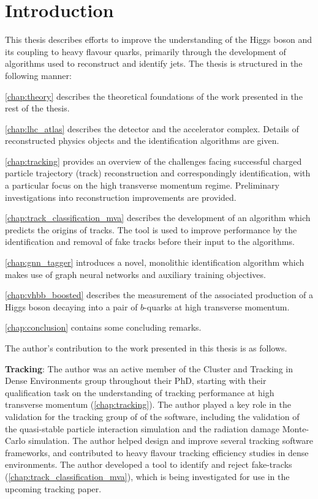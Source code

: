 \chapter{Introduction}\label{chap:intro}


This thesis describes efforts to improve the understanding of the Higgs boson and its coupling to heavy flavour quarks, primarily through the development of algorithms used to reconstruct and identify jets.
The thesis is structured in the following manner:

\cref{chap:theory} describes the theoretical foundations of the work presented in the rest of the thesis.

\cref{chap:lhc_atlas} describes the \ATLAS detector and the \CERN accelerator complex. Details of reconstructed physics objects and the \bjet identification algorithms are given.

\cref{chap:tracking} provides an overview of the challenges facing successful charged particle trajectory (track) reconstruction and correspondingly \bjet identification, with a particular focus on the high transverse momentum regime. Preliminary investigations into reconstruction improvements are provided.

\cref{chap:track_classification_mva} describes the development of an algorithm which predicts the origins of tracks. The tool is used to improve \btagging performance by the identification and removal of fake tracks before their input to the \btagging algorithms.

\cref{chap:gnn_tagger} introduces a novel, monolithic \bjet identification algorithm which makes use of graph neural networks and auxiliary training objectives.

\cref{chap:vhbb_boosted} describes the measurement of the associated production of a Higgs boson decaying into a pair of $b$-quarks at high transverse momentum.

\cref{chap:conclusion} contains some concluding remarks.


\clearpage

The author's contribution to the work presented in this thesis is as follows.

\textbf{Tracking}:
The author was an active member of the Cluster and Tracking in Dense Environments group throughout their PhD, starting with their qualification task on the understanding of tracking performance at high transverse momentum (\cref{chap:tracking}).
The author played a key role in the validation for the tracking group of \rtwotwo of the \ATLAS software, including the validation of the quasi-stable particle interaction simulation and the radiation damage Monte-Carlo simulation. 
The author helped design and improve several tracking software frameworks, and contributed to heavy flavour tracking efficiency studies in dense environments.
The author developed a tool to identify and reject fake-tracks (\cref{chap:track_classification_mva}), which is being investigated for use in the upcoming tracking paper.

